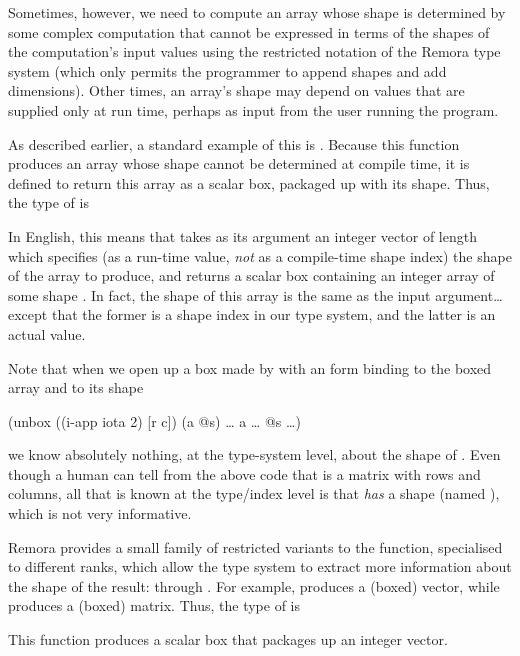 Sometimes, however, we need to compute an array whose shape is
determined by some complex computation that cannot be expressed
in terms of the shapes of the computation's input values using
the restricted notation of the Remora type system
(which only permits the programmer to append shapes and add
dimensions).
Other times, an array's shape may depend on values that are
supplied only at run time,
perhaps as input from the user running the program.

As described earlier, a standard example of this is .
Because this function produces an array whose shape
cannot be determined at compile time, it is defined
to return this array as a scalar box,
packaged up with its shape.
Thus, the type of  is
\begin{code}
\end{code}
In English, this means that  takes as its argument an integer
vector of length  which specifies
(as a run-time value, \emph{not} as a compile-time shape index)
the shape of the array to produce,
and returns a scalar box containing an integer array of some shape
.
In fact, the shape  of this array is the same as the
input argument{\ldots} except that the former is a shape index
in our type system, and the latter is an actual value.

Note that when we open up a box made by  with an  form
binding  to the boxed array and  to its shape
\begin{code}
(unbox ((i-app iota 2) [r c])
       (a @s)
  {\ldots} a {\ldots} @s {\ldots})\end{code}
we know absolutely nothing, at the type-system level,
about the shape of .
Even though a human can tell from the above code that  is
a matrix with  rows and  columns,
all that is known at the type/index level is that 
\emph{has} a shape (named ), which is not very informative.

Remora provides a small family of restricted variants to the 
function, specialised to different ranks, which allow the type system
to extract more information about the shape of the result:  through
.
For example,  produces a (boxed) vector,
while  produces a (boxed) matrix.
Thus, the type of  is
\begin{code}
\end{code}
This function produces a scalar box that packages up an integer
vector.

